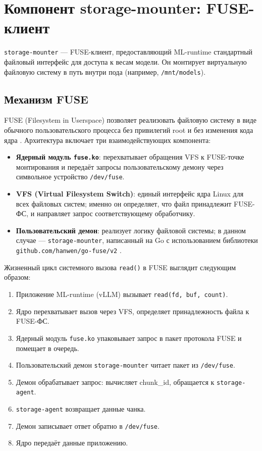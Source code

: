 \section{Компонент storage-mounter: FUSE-клиент}

\texttt{storage-mounter} --- FUSE-клиент, предоставляющий ML-runtime стандартный файловый интерфейс для доступа к весам модели. Он монтирует виртуальную файловую систему в путь внутри пода (например, \texttt{/mnt/models}).

\subsection*{Механизм FUSE}

FUSE (Filesystem in Userspace) позволяет реализовать файловую систему в виде обычного пользовательского процесса без привилегий root и без изменения кода ядра \cite{fuse_kernel_docs}. Архитектура включает три взаимодействующих компонента:

\begin{itemize}[leftmargin=*]
  \item \textbf{Ядерный модуль \texttt{fuse.ko}}: перехватывает обращения VFS к FUSE-точке монтирования и передаёт запросы пользовательскому демону через символьное устройство \texttt{/dev/fuse}.
  \item \textbf{VFS (Virtual Filesystem Switch)}: единый интерфейс ядра Linux для всех файловых систем; именно он определяет, что файл принадлежит FUSE-ФС, и направляет запрос соответствующему обработчику.
  \item \textbf{Пользовательский демон}: реализует логику файловой системы; в данном случае --- \texttt{storage-mounter}, написанный на Go с использованием библиотеки \texttt{github.com/hanwen/go-fuse/v2} \cite{gofuse}.
\end{itemize}

Жизненный цикл системного вызова \texttt{read()} в FUSE выглядит следующим образом:
\begin{enumerate}[leftmargin=*]
  \item Приложение ML-runtime (vLLM) вызывает \texttt{read(fd, buf, count)}.
  \item Ядро перехватывает вызов через VFS, определяет принадлежность файла к FUSE-ФС.
  \item Ядерный модуль \texttt{fuse.ko} упаковывает запрос в пакет протокола FUSE и помещает в очередь.
  \item Пользовательский демон \texttt{storage-mounter} читает пакет из \texttt{/dev/fuse}.
  \item Демон обрабатывает запрос: вычисляет chunk\_id, обращается к \texttt{storage-agent}.
  \item \texttt{storage-agent} возвращает данные чанка.
  \item Демон записывает ответ обратно в \texttt{/dev/fuse}.
  \item Ядро передаёт данные приложению.
\end{enumerate}

